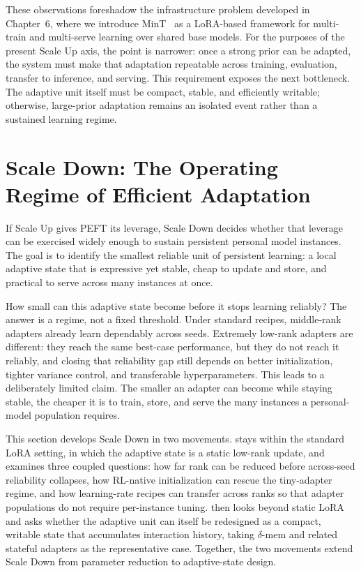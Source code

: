 \documentclass{llmxive}
\begin{document}
These observations foreshadow the infrastructure problem developed in Chapter~6, where we introduce MinT~\citep{mindlab2026mint} as a LoRA-based framework for multi-train and multi-serve learning over shared base models. For the purposes of the present Scale Up axis, the point is narrower: once a strong prior can be adapted, the system must make that adaptation repeatable across training, evaluation, transfer to inference, and serving. This requirement exposes the next bottleneck. The adaptive unit itself must be compact, stable, and efficiently writable; otherwise, large-prior adaptation remains an isolated event rather than a sustained learning regime.



\section{Scale Down: The Operating Regime of Efficient Adaptation}\label{sec:scale-down}

If Scale Up gives PEFT its leverage, Scale Down decides whether that leverage can be exercised widely enough to sustain persistent personal model instances. The goal is to identify the smallest reliable unit of persistent learning: a local adaptive state that is expressive yet stable, cheap to update and store, and practical to serve across many instances at once.

How small can this adaptive state become before it stops learning reliably? The answer is a regime, not a fixed threshold. Under standard recipes, middle-rank adapters already learn dependably across seeds. Extremely low-rank adapters are different: they reach the same best-case performance, but they do not reach it reliably, and closing that reliability gap still depends on better initialization, tighter variance control, and transferable hyperparameters. This leads to a deliberately limited claim. The smaller an adapter can become while staying stable, the cheaper it is to train, store, and serve the many instances a personal-model population requires.

This section develops Scale Down in two movements.  stays within the standard LoRA setting, in which the adaptive state is a static low-rank update, and examines three coupled questions: how far rank can be reduced before across-seed reliability collapses, how RL-native initialization can rescue the tiny-adapter regime, and how learning-rate recipes can transfer across ranks so that adapter populations do not require per-instance tuning.  then looks beyond static LoRA and asks whether the adaptive unit can itself be redesigned as a compact, writable state that accumulates interaction history, taking $\delta$-mem and related stateful adapters as the representative case. Together, the two movements extend Scale Down from parameter reduction to adaptive-state design.
\end{document}
